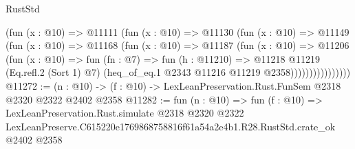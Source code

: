 \begin{lexlean}{RustStd}
\begin{coremodule}
                    (fun (x : @10) =>
                    @11111
                      (fun (x : @10) =>
                      @11130
                        (fun (x : @10) =>
                        @11149
                          (fun (x : @10) =>
                          @11168
                            (fun (x : @10) =>
                            @11187
                              (fun (x : @10) =>
                              @11206
                                (fun (x : @10) =>
                                fun (fn : @7) =>
                                fun (h : @11210) =>
                                @11218
                                  @11219
                                  (Eq.refl.{2} (Sort 1) @7)
                                  (heq_of_eq.{1} @2343 @11216 @11219 @2358))))))))))))))))
@11272 := (n : @10) -> (f : @10) -> LexLeanPreservation.Rust.FunSem @2318 @2320 @2322 @2402 @2358
@11282 := fun (n : @10) =>
  fun (f : @10) =>
  LexLeanPreservation.Rust.simulate
    @2318
    @2320
    @2322
    LexLeanPreserve.C615220e1769868758816f61a54a2e4b1.R28.RustStd.crate_ok
    @2402
    @2358
\end{coremodule}
\end{lexlean}
